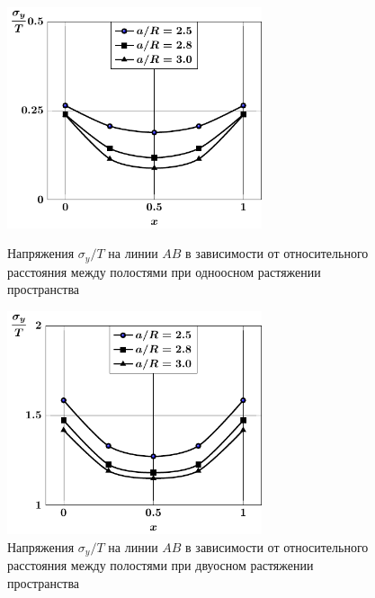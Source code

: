 \begin{russian}
\begin{figure}[h!]
\centering\footnotesize
\parbox[b]{7.5cm}{\centering\includegraphics[width=7.5cm]{cav4-a-d95-t1-sig_y.pdf}
\caption{Напряжения $\sigma_y/T$ на линии $AB$ в зависимости от относительного расстояния между полостями при одноосном растяжении пространства
\label{f:8:103}}}\hfil\hfil
\parbox[b]{7.5cm}{\centering\includegraphics[width=7.5cm]{cav4-a-d95-t2-sig_y.pdf}
\caption{Напряжения $\sigma_y/T$ на линии $AB$ в зависимости от относительного расстояния между полостями при двуосном растяжении пространства
\label{f:8:104}}}
\end{figure}


\end{russian}
